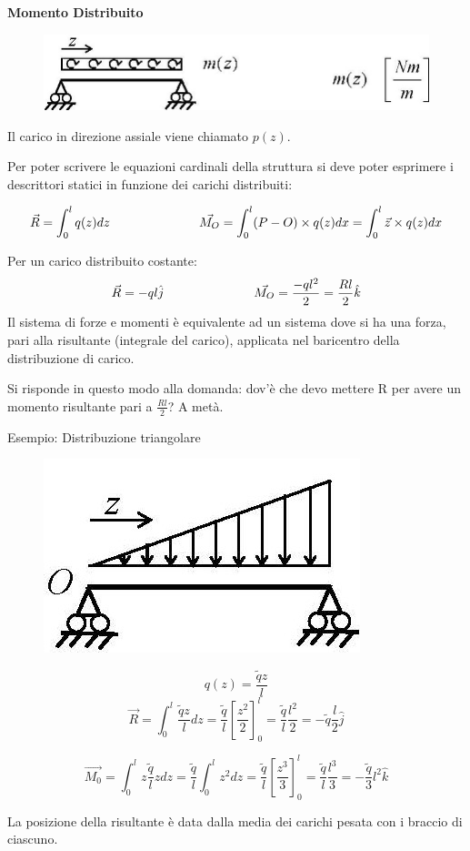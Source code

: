 \documentclass{article}
\begin{document}
\begin{adjustwidth}{2in}{}
	\textbf{Momento Distribuito}	
	
		\begin{figure}[H]
			\centering
			\includegraphics[width=0.4\linewidth]{immagini/1.PARTE2_Pagina_21}
		\end{figure}
	
	Il carico in direzione assiale viene chiamato $p(z)$. \newline
		
	Per poter scrivere le equazioni cardinali della struttura si deve poter esprimere i descrittori statici in funzione dei carichi distribuiti:
	
\[
\vec{R} = \int_{0}^{l}q(z)dz \hspace{2.5cm} \vec{M_O} = \int_{0}^{l}(P-O)\times q(z)dx = \int_{0}^{l} \vec{z} \times q(z)dx
\]

Per un carico distribuito costante:
\[
\vec{R} = -ql\hat{j} \hspace{2.5cm} \vec{M_O} = \frac{-ql^2}{2} = \frac{R l}{2} \hat{k}
\]
Il sistema di forze e momenti è equivalente ad un sistema dove si ha una forza, pari alla risultante (integrale del carico), applicata nel baricentro della distribuzione di carico.

Si risponde in questo modo alla domanda: dov'è che devo mettere R per avere un momento risultante pari a $\frac{R l}{2}$? A metà. \newline

Esempio: Distribuzione triangolare
\begin{figure}[H]
	\centering
	\includegraphics[width=0.15\linewidth]{immagini/1.PARTE2_Pagina_22}
\end{figure}
\[
q(z) = \frac{\tilde{q}z}{l} 
\]
\[
\vec{R} = \int_{0}^{l}\frac{\tilde{q}z}{l}dz = \frac{\tilde{q}}{l} \left[\frac{z^2}{2} \right]_{0}^{l} = \dfrac{\tilde{q}}{l} \frac{l^2}{2} = -\tilde{q} \frac{l}{2} \hat{j}
\]

\[
\vec{M_0} = \int_{0}^{l} z \frac{\tilde{q}}{l} zdz = \frac{\tilde{q}}{l} \int_{0}^{l} z^2dz = \frac{\tilde{q}}{l} \left[\frac{z^3}{3} \right] _{0}^{l} = \frac{\tilde{q}}{l} \frac{l^3}{3} = -\frac{\tilde{q}}{3} l^2 \hat{k}
\]

La posizione della risultante è data dalla media dei carichi pesata con i braccio di ciascuno. 


\end{adjustwidth}
\end{document}
